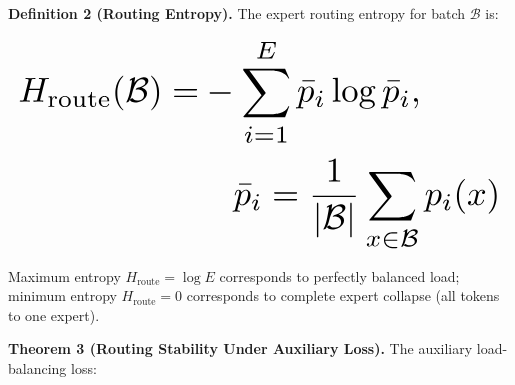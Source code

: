 \documentclass[10pt,twocolumn,letterpaper]{article}
\begin{document}
\textbf{Definition 2 (Routing Entropy).} The expert routing entropy for batch $\mathcal{B}$ is:

























\begin{equation}
\resizebox{\columnwidth}{!}{$\displaystyle
\begin{aligned}
H_{\text{route}}(\mathcal{B}) = & -\sum_{i=1}^E \bar{p}_i \log \bar{p}_i, \\
& \quad \bar{p}_i = \frac{1}{|\mathcal{B}|}\sum_{x \in \mathcal{B}} p_i(x)
\end{aligned}
$}
\end{equation}

























Maximum entropy $H_{\text{route}} = \log E$ corresponds to perfectly balanced load; minimum entropy $H_{\text{route}} = 0$ corresponds to complete expert collapse (all tokens to one expert).

\textbf{Theorem 3 (Routing Stability Under Auxiliary Loss).} The auxiliary load-balancing loss:
\end{document}
